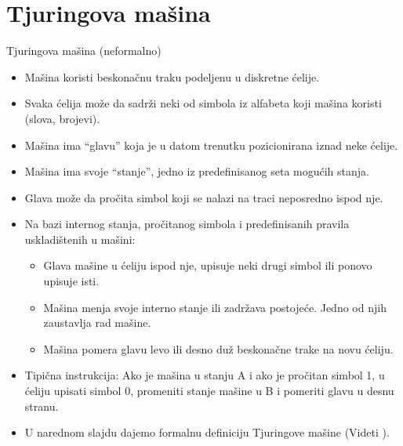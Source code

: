 \documentclass[aspectratio=169, xcolor=table, 10pt]{beamer}
\theoremstyle{definition}
\begin{document}
\section{Tjuringova ma\v sina}

\begin{frame}{Tjuringova ma\v sina (neformalno)}

\begin{itemize}
\item Mašina koristi beskonačnu traku podeljenu u diskretne ćelije.

\item Svaka ćelija može da sadrži neki od simbola iz alfabeta koji mašina koristi (slova, brojevi).

\item Mašina ima “glavu” koja je u datom trenutku pozicionirana iznad neke ćelije.

\item Mašina ima svoje “stanje”, jedno iz predefinisanog seta mogućih stanja.

\item Glava može da pročita simbol koji se nalazi na traci neposredno ispod nje.

\item Na bazi internog stanja, pročitanog simbola i predefinisanih pravila uskladištenih u mašini:

\begin {itemize}

\item Glava mašine u ćeliju ispod nje, upisuje neki drugi simbol ili ponovo upisuje isti.

\item Mašina menja svoje interno stanje ili zadržava postojeće. Jedno od njih zaustavlja rad mašine.

\item Mašina pomera glavu levo ili desno duž beskonačne trake na novu ćeliju.



\end{itemize}

\item Tipična instrukcija: Ako je mašina u stanju A i ako je pročitan simbol 1, u ćeliju upisati simbol 0, promeniti stanje mašine u B i pomeriti glavu u desnu stranu.

\item U narednom slajdu dajemo formalnu definiciju Tjuringove ma\v sine (Videti \cite{hopcroft}).
\end{itemize}
\end{frame}
\end{document}
